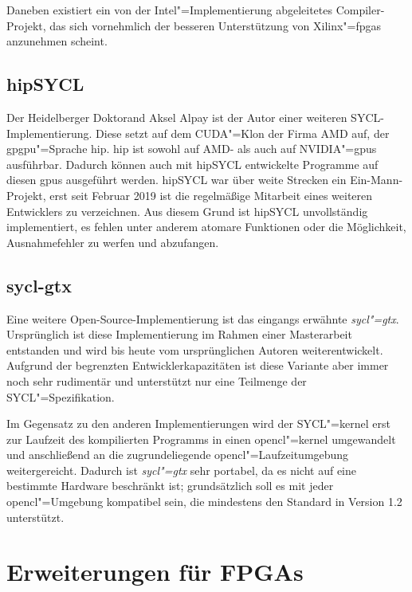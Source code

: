Daneben existiert ein von der Intel"=Implementierung abgeleitetes
Compiler-Projekt, das sich vornehmlich der besseren Unterstützung von
Xilinx"=\gls{fpga}s anzunehmen scheint. \cite[vgl.][]{trisyclclang}

\subsection{hipSYCL}

Der Heidelberger Doktorand Aksel Alpay ist der Autor einer weiteren
SYCL-Implementierung. Diese setzt auf dem CUDA"=Klon der Firma AMD auf, der
\gls{gpgpu}"=Sprache \gls{hip}. \gls{hip} ist sowohl auf AMD- als auch auf
NVIDIA"=\gls{gpu}s ausführbar. Dadurch können auch mit hipSYCL entwickelte
Programme auf diesen \gls{gpu}s ausgeführt werden. hipSYCL war über weite
Strecken ein Ein-Mann-Projekt, erst seit Februar 2019 ist die regelmäßige
Mitarbeit eines weiteren Entwicklers zu verzeichnen. Aus diesem Grund ist
hipSYCL unvollständig implementiert, es fehlen unter anderem atomare Funktionen
oder die Möglichkeit, Ausnahmefehler zu werfen und abzufangen.
\cite[vgl.][]{hipsycl}

\subsection{sycl-gtx}

Eine weitere Open-Source-Implementierung ist das eingangs erwähnte
\textit{sycl"=gtx}. Ursprünglich ist diese Implementierung im Rahmen einer
Masterarbeit entstanden \cite[vgl.][]{zuzek2016} und wird bis heute vom
ursprünglichen Autoren weiterentwickelt. Aufgrund der begrenzten
Entwicklerkapazitäten ist diese Variante aber immer noch sehr rudimentär und
unterstützt nur eine Teilmenge der SYCL"=Spezifikation.

Im Gegensatz zu den anderen Implementierungen wird der SYCL"=\gls{kernel} erst
zur Laufzeit des kompilierten Programms in einen \gls{opencl}"=\gls{kernel}
umgewandelt und anschließend an die zugrundeliegende
\gls{opencl}"=Laufzeitumgebung weitergereicht. Dadurch ist \textit{sycl"=gtx}
sehr portabel, da es nicht auf eine bestimmte Hardware beschränkt ist;
grundsätzlich soll es mit jeder \gls{opencl}"=Umgebung kompatibel sein, die
mindestens den Standard in Version 1.2 unterstützt. 
\cite[vgl.][47\psqq]{zuzek2016}

\section{Erweiterungen für FPGAs}\label{sycl:erweiterungen}

